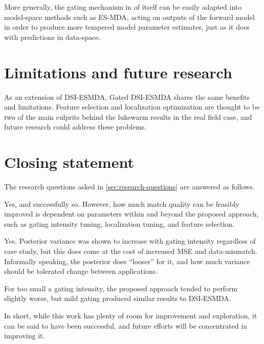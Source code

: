     More generally, the gating mechanism in of itself can be easily adapted into model-space methods such as ES-MDA,
    acting on outputs of the forward model in order to produce more tempered model parameter estimates,
    just as it does with predictions in data-space.


\section{Limitations and future research}

As an extension of DSI-ESMDA, Gated DSI-ESMDA shares the same benefits and limitations.
Feature selection and localization optimization are thought to be two of the main culprits behind
the lukewarm results in the real field case, and future research could address these problems.

\section{Closing statement}
    The research questions asked in \cref{sec:research-questions} are answered as follows. 
    
    \medskip

    
    Yes, and successfully so. However, how much match quality can be feasibly improved is dependent on parameters within and beyond the proposed approach,
    such as gating intensity tuning, localization tuning, and feature selection. 

    \medskip

    
    Yes. Posterior variance was shown to increase with gating intensity regardless of case study, but this does come at the cost of increased MSE and data-mismatch. 
    Informally speaking, the posterior does ``looser'' for it, and how much variance should be tolerated change between applications. 

    \medskip
        
    
    For too small a gating intensity, the proposed approach tended to perform slightly worse,
    but mild gating produced similar results to DSI-ESMDA.

    \medskip

    In short, while this work has plenty of room for improvement and exploration, 
    it can be said to have been successful, and future efforts will be concentrated in improving it.